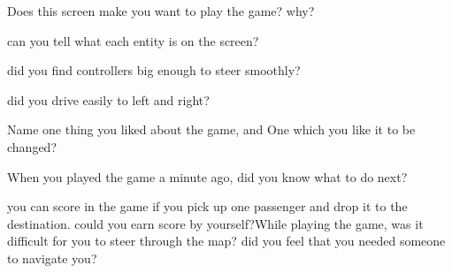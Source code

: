 \documentclass[a4paper, answers,fleqn]{exam}
\begin{document}
\begin{questions}

\question Does this screen make you want to play the game? why?

\question can you tell what each entity is on the screen?

\question did you find controllers big enough to steer smoothly?

\question did you drive easily to left and right?

\question Name one thing you liked about the game, and One which you like it to be changed? 

\question When you played the game a minute ago, did you know what to do next?

\question you can score in the game if you pick up one passenger and drop it to the destination. could you earn score by yourself?While playing the game, was it difficult for you to steer through the map? did you  feel that you needed someone to navigate you?
 

	
\end{questions}
\end{document}
